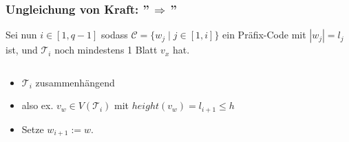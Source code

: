 \documentclass{beamer}
\begin{document}
\begin{frame}[t]
\begin{columns}
\begin{column}{0.5\textwidth}
{\begin{center}
            \end{center}
            }
    \end{column}
    \end{columns}
\end{frame}

\begin{frame}
    \frametitle{Ungleichung von Kraft: ''$\,\Longrightarrow\,$''}
    Sei nun $i \in [1,q-1]$ sodass $\mathcal{C} = \{w_j \mid j \in [1,i]\}$ ein Präfix-Code
    mit $|w_j| = l_j$ ist, und $\mathcal{T}_i$ noch mindestens 1 Blatt $v_x$ hat.\\[10pt]\pause

    \begin{columns}
    \begin{column}{0.77\textwidth}
        \begin{itemize}
            \item $\mathcal{T}_i$ zusammenhängend\\[10pt]
            \item also ex. $v_w \in V(\mathcal{T}_i)$ mit $height(v_w) = l_{i+1} \leq h$\\[10pt]
            \item Setze $w_{i+1} := w$.
        \end{itemize}
    \end{column}
    \begin{column}{0.23\textwidth}\onslide
        \begin{center}
        \end{center}
    \end{column}
    \end{columns}
\end{frame}
\end{document}

